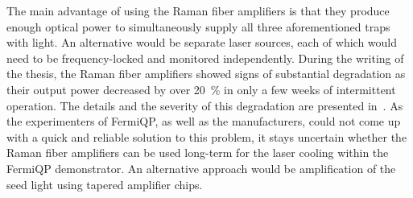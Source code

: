 The main advantage of using the Raman fiber amplifiers is that they produce enough optical power to simultaneously supply all three aforementioned traps with light. An alternative would be separate laser sources, each of which would need to be frequency-locked and monitored independently. During the writing of the thesis, the Raman fiber amplifiers showed signs of substantial degradation as their output power decreased by over \SI{20}{\percent} in only a few weeks of intermittent operation. The details and the severity of this degradation are presented in~\cite{qesja_design_2022}. As the experimenters of FermiQP, as well as the manufacturers, could not come up with a quick and reliable solution to this problem, it stays uncertain whether the Raman fiber amplifiers can be used long-term for the laser cooling within the FermiQP demonstrator. An alternative approach would be amplification of the seed light using tapered amplifier chips.

